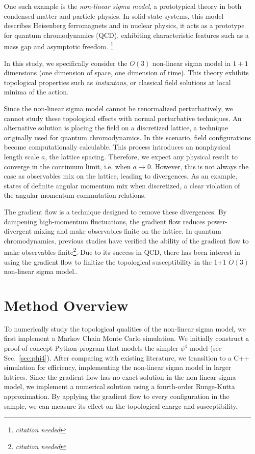 \documentclass[12pt]{report}
\newcommand{\citeneeded}{\footnote{\textit{citation needed}}}
\begin{document}
One such example is the \textit{non-linear sigma model}, a prototypical theory in both condensed matter and particle physics. In solid-state systems, this model describes Heisenberg ferromagnets and in nuclear physics, it acts as a prototype for quantum chromodynamics (QCD), exhibiting characteristic features such as a mass gap and asymptotic freedom. \citeneeded

In this study, we specifically consider the $O(3)$ non-linear sigma model in $1+1$ dimensions (one dimension of space, one dimension of time). This theory exhibits topological properties such as \textit{instantons}, or classical field solutions at local minima of the action.



Since the non-linear sigma model cannot be renormalized perturbatively, we cannot study these topological effects with normal perturbative techniques. An alternative solution is placing the field on a discretized lattice, a technique originally used for quantum chromodynamics. In this scenario, field configurations become computationally calculable. This process introduces an nonphysical length scale $a$, the lattice spacing. Therefore, we expect any physical result to converge in the continuum limit, i.e. when $a\rightarrow 0$. However, this is not always the case as observables mix on the lattice, leading to divergences. As an example, states of definite angular momentum mix when discretized, a clear violation of the angular momentum commutation relations. 


The gradient flow is a technique designed to remove these divergences. By dampening high-momentum fluctuations, the gradient flow reduces power-divergent mixing and make observables finite on the lattice.\cite{monahan2016} In quantum chromodynamics, previous studies have verified the ability of the gradient flow to make observables finite\citeneeded. Due to its success in QCD, there has been interest in using the gradient flow to finitize the topological susceptibility in the 1+1 $O(3)$ non-linear sigma model.\cite{bietenholz2018}.


\section{Method Overview}

To numerically study the topological qualities of the non-linear sigma model, we first implement a Markov Chain Monte Carlo simulation. We initially construct a proof-of-concept Python program that models the simpler $\phi^4$ model (see Sec.~\ref{sec:phi4}). After comparing with existing literature, we transition to a C++ simulation for efficiency, implementing the non-linear sigma model in larger lattices. Since the gradient flow has no exact solution in the non-linear sigma model, we implement a numerical solution using a fourth-order Runge-Kutta approximation. By applying the gradient flow to every configuration in the sample, we can measure its effect on the topological charge and susceptibility.
\end{document}
